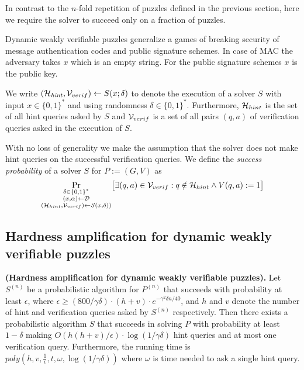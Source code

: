In contrast to the $n$-fold repetition of puzzles defined in the previous section, here we
require the solver to succeed only on a fraction of puzzles.

Dynamic weakly verifiable puzzles generalize a games of breaking security of message authentication codes and public signature schemes.
In case of MAC the adversary takes $x$ which is an empty string. For the public signature schemes $x$ is the public key.

We write $(\mathcal{H}_{\mathit{hint}}, \mathcal{V}_{verif}) \leftarrow S(x; \delta)$
to denote the execution of a solver $S$ with input $x \in \{0,1\}^{*}$ and using randomness $\delta \in \{0,1\}^{*}$.
Furthermore, $\mathcal{H}_{hint}$ is the set of all hint queries asked by $S$ and $\mathcal{V}_{verif}$ is
a set of all pairs $(q,a)$ of verification queries asked in the execution of $S$.

With no loss of generality we make the assumption that the solver does not make
hint queries on the successful verification queries.
We define the \textit{success probability} of a solver $S$ for $P := (G,V)$ as
\begin{align*}
  \underset{\substack{\delta \in \{0,1\}^{*} \\(x,\alpha) \leftarrow \mathcal{D} \\ (\mathcal{H}_{hint}, \mathcal{V}_{verif}) \leftarrow S(x,\delta))}}
  {\Pr}\big[\exists (q,a) \in \mathcal{V}_{verif} : q \notin \mathcal{H}_{hint} \land V(q,a) := 1 \big]
\end{align*}

\subsection{Hardness amplification for dynamic weakly verifiable puzzles}
\begin{theorem}\textbf{(Hardness amplification for dynamic weakly verifiable puzzles).}
\label{lemma:dwvp}
Let $S^{(n)}$ be a probabilistic algorithm for $P^{(n)}$ that succeeds with
probability at least $\epsilon$, where $\epsilon \geq (800/\gamma\delta) \cdot (h+v) \cdot e^{-\gamma^2\delta n/40}$, and $h$ and $v$
denote the number of hint and verification queries asked by $S^{(n)}$ respectively.
Then there exists a probabilistic algorithm $S$ that succeeds in solving $P$ with probability at least
$1-\delta$ making $O(h(h+v)/\epsilon) \cdot \log(1/\gamma\delta)$ hint queries and at most one verification query.
Furthermore, the running time is $\mathit{poly}(h,v,\frac{1}{\epsilon}, t, \omega, \log(1/\gamma\delta))$ where
$\omega$ is time needed to ask a single hint query.
\end{theorem}

